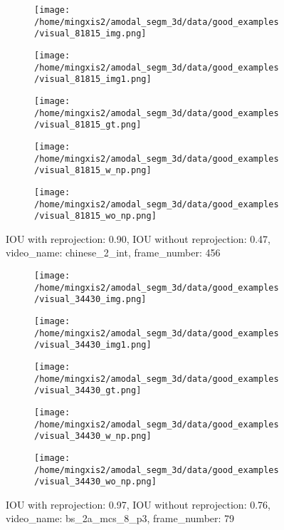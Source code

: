 \begin{figure}
\centering
\begin{subfigure}[t]{0.19\textwidth}
\centering
\texttt{[image: /home/mingxis2/amodal\_segm\_3d/data/good\_examples/visual\_81815\_img.png]}
\end{subfigure}
\begin{subfigure}[t]{0.19\textwidth}
\centering
\texttt{[image: /home/mingxis2/amodal\_segm\_3d/data/good\_examples/visual\_81815\_img1.png]}
\end{subfigure}
\begin{subfigure}[t]{0.19\textwidth}
\centering
\texttt{[image: /home/mingxis2/amodal\_segm\_3d/data/good\_examples/visual\_81815\_gt.png]}
\end{subfigure}
\begin{subfigure}[t]{0.19\textwidth}
\centering
\texttt{[image: /home/mingxis2/amodal\_segm\_3d/data/good\_examples/visual\_81815\_w\_np.png]}
\end{subfigure}
\begin{subfigure}[t]{0.19\textwidth}
\centering
\texttt{[image: /home/mingxis2/amodal\_segm\_3d/data/good\_examples/visual\_81815\_wo\_np.png]}
\end{subfigure}
\caption{IOU with reprojection: 0.90, IOU without reprojection: 0.47, video\_name: chinese\_2\_int, frame\_number: 456}
\end{figure}

\begin{figure}
\centering
\begin{subfigure}[t]{0.19\textwidth}
\centering
\texttt{[image: /home/mingxis2/amodal\_segm\_3d/data/good\_examples/visual\_34430\_img.png]}
\end{subfigure}
\begin{subfigure}[t]{0.19\textwidth}
\centering
\texttt{[image: /home/mingxis2/amodal\_segm\_3d/data/good\_examples/visual\_34430\_img1.png]}
\end{subfigure}
\begin{subfigure}[t]{0.19\textwidth}
\centering
\texttt{[image: /home/mingxis2/amodal\_segm\_3d/data/good\_examples/visual\_34430\_gt.png]}
\end{subfigure}
\begin{subfigure}[t]{0.19\textwidth}
\centering
\texttt{[image: /home/mingxis2/amodal\_segm\_3d/data/good\_examples/visual\_34430\_w\_np.png]}
\end{subfigure}
\begin{subfigure}[t]{0.19\textwidth}
\centering
\texttt{[image: /home/mingxis2/amodal\_segm\_3d/data/good\_examples/visual\_34430\_wo\_np.png]}
\end{subfigure}
\caption{IOU with reprojection: 0.97, IOU without reprojection: 0.76, video\_name: bs\_2a\_mcs\_8\_p3, frame\_number: 79}
\end{figure}

